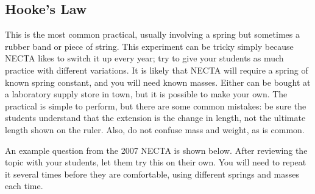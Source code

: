 \subsection{Hooke’s Law}  

This is the most common practical, usually involving a spring but sometimes a
rubber band or piece of string. This experiment can be tricky simply because NECTA
likes to switch it up every year; try to give your students as much practice with different
variations. It is likely that NECTA will require a spring of known spring constant, and
you will need known masses. Either can be bought at a laboratory supply store in town,
but it is possible to make your own. The practical is simple to perform, but there are
some common mistakes: be sure the students understand that the extension is the change
in length, not the ultimate length shown on the ruler. Also, do not confuse mass and
weight, as is common.

An example question from the 2007 NECTA is shown below. After reviewing
the topic with your students, let them try this on their own. You will need to repeat it
several times before they are comfortable, using different springs and masses each time.

